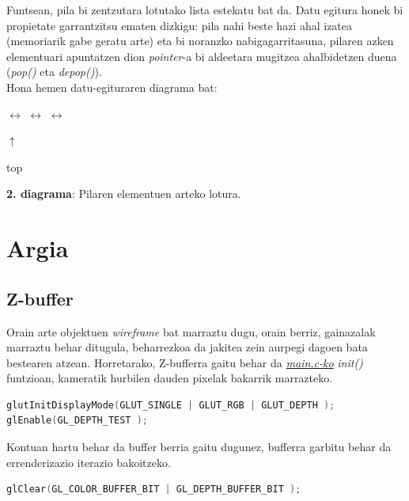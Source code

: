 \documentclass[12pt]{article}
\newcommand{\fitxategi}[1] {\underline{\textit{#1}}}
\newcommand{\metodo}[1] {\textit{#1}}
\begin{document}
Funtsean, pila bi zentzutara lotutako lista estekatu bat da. Datu egitura honek bi propietate garrantzitsu ematen dizkigu: pila nahi beste hazi ahal izatea (memoriarik gabe geratu arte) eta bi noranzko nabigagarritasuna, pilaren azken elementuari apuntatzen dion \textit{pointer}-a bi aldeetara mugitzea ahalbidetzen duena (\metodo{pop()} eta \metodo{depop()}).\\
Hona hemen datu-egituraren diagrama bat:

\begin{center}

 $\leftrightarrow$  $\leftrightarrow$  $\leftrightarrow$ 

\hspace{5.5cm} $\uparrow$

\hspace{5.5cm} top

\textbf{2. diagrama}: Pilaren elementuen arteko lotura.
\end{center}




\section{Argia}

\subsection{Z-buffer}

Orain arte objektuen \textit{wireframe}\cite{wireframe} bat marraztu dugu, orain berriz, gainazalak marraztu behar ditugula, beharrezkoa da jakitea zein aurpegi dagoen bata bestearen atzean. Horretarako, Z-bufferra gaitu behar da \fitxategi{main.c-ko} \metodo{init()} funtzioan, kameratik hurbilen dauden pixelak bakarrik marrazteko.

\begin{lstlisting}[language=C]
glutInitDisplayMode(GLUT_SINGLE | GLUT_RGB | GLUT_DEPTH );
glEnable(GL_DEPTH_TEST );
\end{lstlisting}

Kontuan hartu behar da buffer berria gaitu dugunez, bufferra garbitu behar da errenderizazio iterazio bakoitzeko.

\begin{lstlisting}[language=C]
glClear(GL_COLOR_BUFFER_BIT | GL_DEPTH_BUFFER_BIT );
\end{lstlisting}
\end{document}
